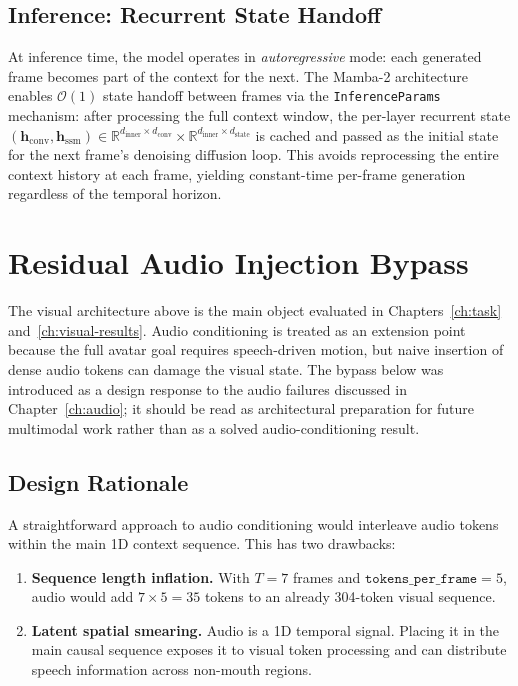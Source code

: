 \documentclass[12pt,letterpaper]{report}
\begin{document}
\subsection{Inference: Recurrent State Handoff}

At inference time, the model operates in \emph{autoregressive} mode: each
generated frame becomes part of the context for the next. The Mamba-2
architecture enables $\mathcal{O}(1)$ state handoff between frames via the
\texttt{InferenceParams} mechanism: after processing the full context window,
the per-layer recurrent state
$(\mathbf{h}_{\mathrm{conv}}, \mathbf{h}_{\mathrm{ssm}}) \in \mathbb{R}^{d_{\mathrm{inner}} \times d_{\mathrm{conv}}} \times \mathbb{R}^{d_{\mathrm{inner}} \times d_{\mathrm{state}}}$
is cached and passed as the initial state for the next frame's denoising
diffusion loop. This avoids reprocessing the entire context history at each
frame, yielding constant-time per-frame generation regardless of the temporal
horizon. %

\section{Residual Audio Injection Bypass}\label{sec:audio-bypass}

The visual architecture above is the main object evaluated in Chapters~\ref{ch:task} and~\ref{ch:visual-results}. Audio conditioning is treated as an extension point because the full avatar goal requires speech-driven motion, but naive insertion of dense audio tokens can damage the visual state. The bypass below was introduced as a design response to the audio failures discussed in Chapter~\ref{ch:audio}; it should be read as architectural preparation for future multimodal work rather than as a solved audio-conditioning result.

\subsection{Design Rationale}

A straightforward approach to audio conditioning would interleave audio tokens within the main 1D context sequence. This has two drawbacks:

\begin{enumerate}
    \item \textbf{Sequence length inflation.} With $T=7$ frames and $\texttt{tokens\_per\_frame} = 5$, audio would add $7 \times 5 = 35$ tokens to an already 304-token visual sequence.
    \item \textbf{Latent spatial smearing.} Audio is a 1D temporal signal. Placing it in the main causal sequence exposes it to visual token processing and can distribute speech information across non-mouth regions.
\end{enumerate}
\end{document}
